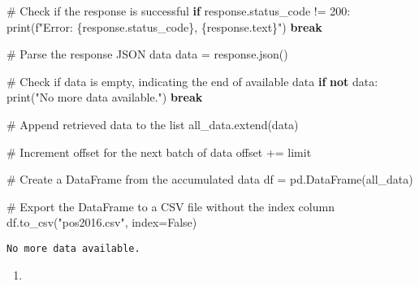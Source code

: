 \documentclass[
  letterpaper,
  DIV=11,
  numbers=noendperiod]{scrartcl}
\newenvironment{Shaded}{\begin{snugshade}}{\end{snugshade}}
\newcommand{\BuiltInTok}[1]{\textcolor[rgb]{0.00,0.23,0.31}{#1}}
\newcommand{\CommentTok}[1]{\textcolor[rgb]{0.37,0.37,0.37}{#1}}
\newcommand{\ControlFlowTok}[1]{\textcolor[rgb]{0.00,0.23,0.31}{\textbf{#1}}}
\newcommand{\DecValTok}[1]{\textcolor[rgb]{0.68,0.00,0.00}{#1}}
\newcommand{\KeywordTok}[1]{\textcolor[rgb]{0.00,0.23,0.31}{\textbf{#1}}}
\newcommand{\NormalTok}[1]{\textcolor[rgb]{0.00,0.23,0.31}{#1}}
\newcommand{\OperatorTok}[1]{\textcolor[rgb]{0.37,0.37,0.37}{#1}}
\newcommand{\SpecialCharTok}[1]{\textcolor[rgb]{0.37,0.37,0.37}{#1}}
\newcommand{\SpecialStringTok}[1]{\textcolor[rgb]{0.13,0.47,0.30}{#1}}
\newcommand{\StringTok}[1]{\textcolor[rgb]{0.13,0.47,0.30}{#1}}
\newcommand{\VariableTok}[1]{\textcolor[rgb]{0.07,0.07,0.07}{#1}}
\providecommand{\tightlist}{%
  \setlength{\itemsep}{0pt}\setlength{\parskip}{0pt}}\usepackage{longtable,booktabs,array}
\begin{document}
\begin{Shaded}
\begin{Highlighting}[]
    \CommentTok{\# Check if the response is successful}
    \ControlFlowTok{if}\NormalTok{ response.status\_code }\OperatorTok{!=} \DecValTok{200}\NormalTok{:}
        \BuiltInTok{print}\NormalTok{(}\SpecialStringTok{f"Error: }\SpecialCharTok{\{}\NormalTok{response}\SpecialCharTok{.}\NormalTok{status\_code}\SpecialCharTok{\}}\SpecialStringTok{, }\SpecialCharTok{\{}\NormalTok{response}\SpecialCharTok{.}\NormalTok{text}\SpecialCharTok{\}}\SpecialStringTok{"}\NormalTok{)}
        \ControlFlowTok{break}

    \CommentTok{\# Parse the response JSON data}
\NormalTok{    data }\OperatorTok{=}\NormalTok{ response.json()}

    \CommentTok{\# Check if data is empty, indicating the end of available data}
    \ControlFlowTok{if} \KeywordTok{not}\NormalTok{ data:}
        \BuiltInTok{print}\NormalTok{(}\StringTok{"No more data available."}\NormalTok{)}
        \ControlFlowTok{break}

    \CommentTok{\# Append retrieved data to the list}
\NormalTok{    all\_data.extend(data)}

    \CommentTok{\# Increment offset for the next batch of data}
\NormalTok{    offset }\OperatorTok{+=}\NormalTok{ limit}

\CommentTok{\# Create a DataFrame from the accumulated data}
\NormalTok{df }\OperatorTok{=}\NormalTok{ pd.DataFrame(all\_data)}

\CommentTok{\# Export the DataFrame to a CSV file without the index column}
\NormalTok{df.to\_csv(}\StringTok{"pos2016.csv"}\NormalTok{, index}\OperatorTok{=}\VariableTok{False}\NormalTok{)}
\end{Highlighting}
\end{Shaded}

\begin{verbatim}
No more data available.
\end{verbatim}

\begin{enumerate}
\def\labelenumi{\arabic{enumi}.}
\setcounter{enumi}{1}
\tightlist
\item
\end{enumerate}
\end{document}

